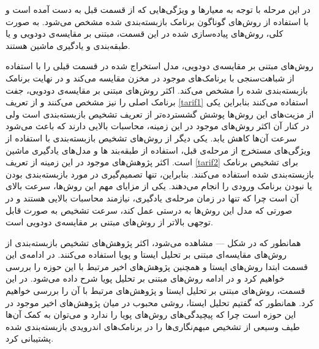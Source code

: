 در این مرحله با توجه به معیار‌ها و ویژگی‌هایی که از قسمت قبل به دست آمده است و با استفاده از روش‌های گوناگون برنامک بازبسته‌بندی شده مشخص می‌شود. به صورت کلی، روش‌های پیاده‌سازی شده در این قسمت، مبتنی بر مقایسه‌ی دودویی و یا طبقه‌بندی و یادگیری ماشین هستند.

 روش‌های مبتنی بر مقایسه‌ی دودویی، مدل استخراج شده در قسمت قبلی را با استفاده از شباهت‌سنجی با برنامک‌های موجود در مخزن مقایسه می‌کند و در نهایت برنامک بازبسته‌بندی شده را مشخص می‌کند. اکثر روش‌های مبتنی بر مقایسه‌ی دودویی، جفت برنامک اصلی را نیز مشخص می‌کنند و از تعریف
\ref{tarif1}
استفاده می‌کنند بنابراین یکی از مزیت‌های این روش‌ها پوشش گشسترده‌تر از تعریف تشخیص بازبسته‌بندی است ولی در کنار آن اکثر روش‌های موجود در این زمینه، محاسبات بالایی دارند که باعث می‌شود سرعت آن‌ها کاهش یابد.
 یکی دیگر از روش‌های تشخیص بازبسته‌بندی با استفاده از ویژگی‌های مستخرج از مرحله‌ی قبل، استفاده از طبقه‌بند ها و مدل‌های یادگیری ماشین است. اکثر پژوهش‌های موجود در این زمینه از تعریف
\ref{tarif2}
برای تشخیص برنامک بازبسته‌بندی شده استفاده می‌کنند. بنابراین، تنها تصمیم‌گیری در مورد بازبسته‌بندی بودن یا نبودن برنامک ورودی را انجام می‌دهند. یکی از مزایای مهم این رو‌ش‌ها، سرعت بالای آن است چرا که تنها در زمان مرحله‌ی یادگیری، نیازمند محاسبات بالایی هستند و در صورتی که مدل این روش‌ها به درستی عمل کند، سرعت تشخیص به صورت قابل توجهی بالاتر از روش‌های مبتنی بر مقایسه‌ی دودویی است.

همانطور که در شکل --- مشاهده می‌شود، اکثر پژوهش‌های تشخیص بازبسته‌بندی از روش‌های مقایسه‌ای مبتنی بر تحلیل ایستا و پویا استفاده می‌کنند. در ادامه‌ی این قسمت ابتدا روش‌های ایستا و همچنین پژوهش‌های اخیر مرتبط با این حوزه را بررسی خواهیم کرد و در ادامه روش‌های مبتنی بر تحلیل پویا شرح داده می‌شود.
در این قسمت‌، روش‌های مبتنی بر تحلیل ایستا و پژوهش‌های مرتبط با آن را بررسی خواهیم کرد. همانطور که گفتیم تحلیل ایستا، روشی محبوب در میان پژوهش‌های اخیر موجود در این حوزه است چرا که پیچیدگی‌های روش‌های پویا را ندارد و می‌توان به کمک آن‌ها طیف وسیعی از تشخیص مبهم‌نگاری‌ها را در برنامک‌های اندرویدی بازبسته‌بندی شده پشتیبانی کرد.

